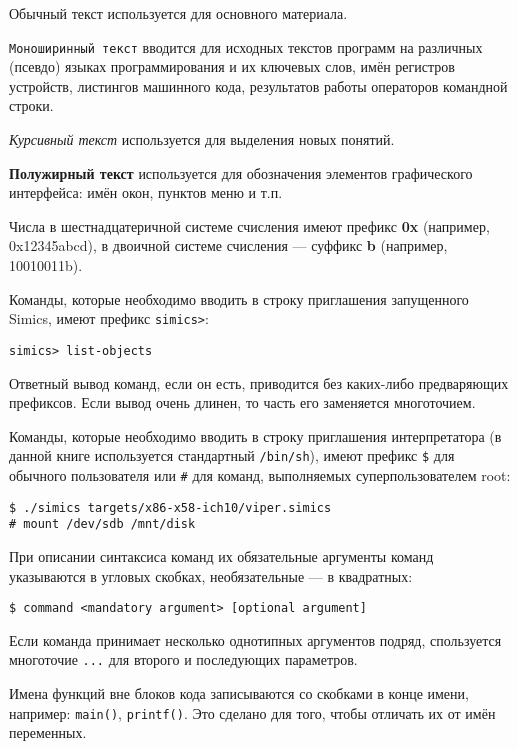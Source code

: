 \begin{itemize*}
    \item Обычный текст используется для основного материала.
    \item \texttt{Моноширинный текст} вводится для исходных текстов программ на различных (псевдо) языках программирования и их ключевых слов,  имён регистров устройств, листингов машинного кода, результатов работы операторов командной строки.
    \item \textit{Курсивный текст} используется для выделения новых понятий.
    \item \textbf{Полужирный текст} используется для обозначения элементов графического интерфейса: имён окон, пунктов меню и т.п.
    \item Числа в шестнадцатеричной системе счисления имеют префикс \textbf{0x} (например, 0x12345abcd), в двоичной системе счисления --- суффикс \textbf{b} (например, 10010011b).
    \item Команды, которые необходимо вводить в строку приглашения запущенного Simics, имеют префикс \texttt{simics>}:
    \begin{lstlisting}
simics> list-objects
    \end{lstlisting}
	Ответный вывод команд, если он есть, приводится без каких-либо предваряющих префиксов. Если вывод очень длинен, то часть его заменяется многоточием.
    \item Команды, которые необходимо вводить в строку приглашения интерпретатора (в данной книге используется стандартный \texttt{/bin/sh}), имеют префикс \texttt{\$} для обычного пользователя или \texttt{\#} для команд, выполняемых суперпользователем root:
    \begin{lstlisting}
$ ./simics targets/x86-x58-ich10/viper.simics
# mount /dev/sdb /mnt/disk
    \end{lstlisting}

    \item При описании синтаксиса команд их обязательные аргументы команд указываются в угловых скобках, необязательные --- в квадратных:
    \begin{lstlisting}
$ command <mandatory argument> [optional argument]
    \end{lstlisting}
	Если команда принимает несколько однотипных аргументов подряд, спользуется многоточие \texttt{...} для второго и последующих параметров.
    \item Имена функций вне блоков кода записываются со скобками в конце имени, например: \texttt{main()}, \texttt{printf()}. Это сделано для того, чтобы отличать их от имён переменных.
\end{itemize*}

